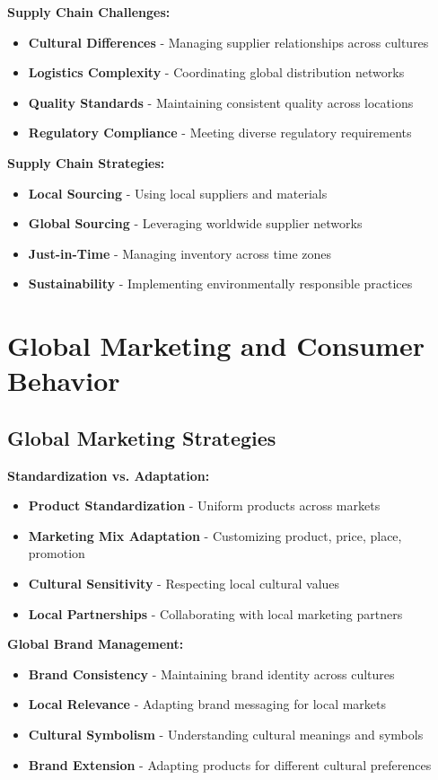 \documentclass[12pt]{article}
\begin{document}
\textbf{Supply Chain Challenges:}
\begin{itemize}
    \item \textbf{Cultural Differences} - Managing supplier relationships across cultures
    \item \textbf{Logistics Complexity} - Coordinating global distribution networks
    \item \textbf{Quality Standards} - Maintaining consistent quality across locations
    \item \textbf{Regulatory Compliance} - Meeting diverse regulatory requirements
\end{itemize}

\textbf{Supply Chain Strategies:}
\begin{itemize}
    \item \textbf{Local Sourcing} - Using local suppliers and materials
    \item \textbf{Global Sourcing} - Leveraging worldwide supplier networks
    \item \textbf{Just-in-Time} - Managing inventory across time zones
    \item \textbf{Sustainability} - Implementing environmentally responsible practices
\end{itemize}

\section{Global Marketing and Consumer Behavior}

\subsection{Global Marketing Strategies}

\textbf{Standardization vs. Adaptation:}
\begin{itemize}
    \item \textbf{Product Standardization} - Uniform products across markets
    \item \textbf{Marketing Mix Adaptation} - Customizing product, price, place, promotion
    \item \textbf{Cultural Sensitivity} - Respecting local cultural values
    \item \textbf{Local Partnerships} - Collaborating with local marketing partners
\end{itemize}

\textbf{Global Brand Management:}
\begin{itemize}
    \item \textbf{Brand Consistency} - Maintaining brand identity across cultures
    \item \textbf{Local Relevance} - Adapting brand messaging for local markets
    \item \textbf{Cultural Symbolism} - Understanding cultural meanings and symbols
    \item \textbf{Brand Extension} - Adapting products for different cultural preferences
\end{itemize}
\end{document}
